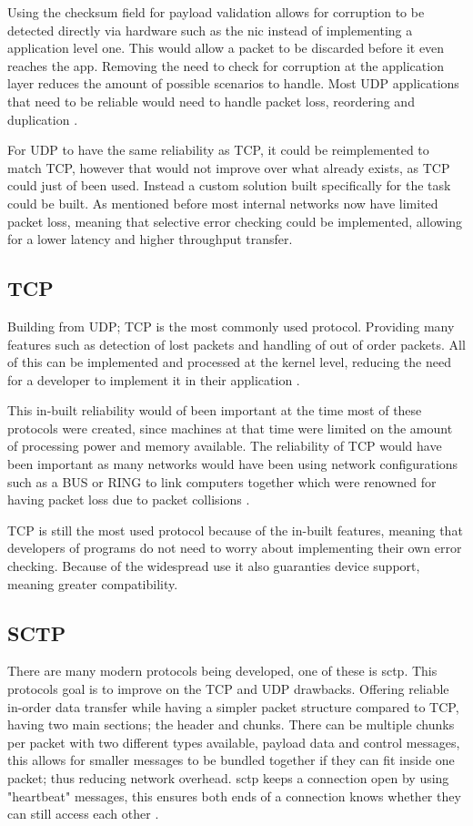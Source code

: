 Using the checksum field for payload validation allows for corruption to be detected directly via hardware such as the \acrfull{nic} instead of implementing a application level one. This would allow a packet to be discarded before it even reaches the app. Removing the need to check for corruption at the application layer reduces the amount of possible scenarios to handle. Most UDP applications that need to be reliable would need to handle packet loss, reordering and duplication \parencite{steinke2001tcp}.

For UDP to have the same reliability as TCP, it could be reimplemented to match TCP, however that would not improve over what already exists, as TCP could just of been used. Instead a custom solution built specifically for the task could be built. As mentioned before most internal networks now have limited packet loss, meaning that selective error checking could be implemented, allowing for a lower latency and higher throughput transfer.

\subsection*{TCP}
Building from UDP; TCP is the most commonly used protocol. Providing many features such as detection of lost packets and handling of out of order packets. All of this can be implemented and processed at the kernel level, reducing the need for a developer to implement it in their application \parencite{tcp-rfc793}.

This in-built reliability would of been important at the time most of these protocols were created, since machines at that time were limited on the amount of processing power and memory available. The reliability of TCP would have been important as many networks would have been using network configurations such as a BUS or RING to link computers together which were renowned for having packet loss due to packet collisions \parencite{steinke2001tcp}.

TCP is still the most used protocol because of the in-built features, meaning that developers of programs do not need to worry about implementing their own error checking. Because of the widespread use it also guaranties device support, meaning greater compatibility.

\subsection*{SCTP}
There are many modern protocols being developed, one of these is \acrfull{sctp}. This protocols goal is to improve on the TCP and UDP drawbacks. Offering reliable in-order data transfer while having a simpler packet structure compared to TCP, having two main sections; the header and chunks. There can be multiple chunks per packet with two different types available, payload data and control messages, this allows for smaller messages to be bundled together if they can fit inside one packet; thus reducing network overhead. \acrshort{sctp} keeps a connection open by using "heartbeat" messages, this ensures both ends of a connection knows whether they can still access each other \parencite{sctp-rfc9260} \parencite{ladha2004improving}.

